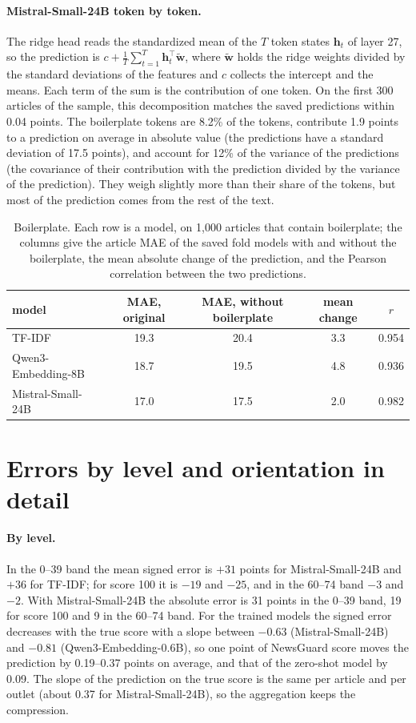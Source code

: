\documentclass[11pt,a4paper]{article}
\begin{document}
\paragraph{Mistral-Small-24B token by token.} The ridge head reads the standardized mean of the $T$ token states
$\mathbf{h}_t$ of layer 27, so the prediction is $c + \frac{1}{T}\sum_{t=1}^{T}\mathbf{h}_t^\top\tilde{\mathbf{w}}$,
where $\tilde{\mathbf{w}}$ holds the ridge weights divided by the standard deviations of the features and $c$ collects
the intercept and the means. Each term of the sum is the contribution of one token. On the first 300 articles of the
sample, this decomposition matches the saved predictions within 0.04 points. The boilerplate tokens are 8.2\% of the
tokens, contribute 1.9 points to a prediction on average in absolute value (the predictions have a standard deviation of
17.5 points), and account for 12\% of the variance of the predictions (the covariance of their contribution with the
prediction divided by the variance of the prediction). They weigh slightly more than their share of the tokens, but most
of the prediction comes from the rest of the text.

\begin{table}[h]
\centering
\caption{Boilerplate. Each row is a model, on 1,000 articles that contain boilerplate; the columns give the article MAE
of the saved fold models with and without the boilerplate, the mean absolute change of the prediction, and the Pearson
correlation between the two predictions.}\label{tab:reading}
\begin{tabular}{lcccc}
\toprule
model & MAE, original & MAE, without boilerplate & mean change & $r$ \\
\midrule
TF-IDF & 19.3 & 20.4 & 3.3 & 0.954 \\
Qwen3-Embedding-8B & 18.7 & 19.5 & 4.8 & 0.936 \\
Mistral-Small-24B & 17.0 & 17.5 & 2.0 & 0.982 \\
\bottomrule
\end{tabular}
\end{table}

\section{Errors by level and orientation in detail}\label{app:errors}
\paragraph{By level.} In the 0--39 band the mean signed error is $+31$ points for Mistral-Small-24B and $+36$ for TF-IDF;
for score 100 it is $-19$ and $-25$, and in the 60--74 band $-3$ and $-2$. With Mistral-Small-24B the absolute error is
31 points in the 0--39 band, 19 for score 100 and 9 in the 60--74 band. For the trained models the signed error
decreases with the true score with a slope between $-0.63$ (Mistral-Small-24B) and $-0.81$ (Qwen3-Embedding-0.6B), so
one point of NewsGuard score moves the prediction by 0.19--0.37 points on average, and that of the zero-shot model by
0.09. The slope of the prediction on the true score is the same per article and per outlet (about 0.37 for
Mistral-Small-24B), so the aggregation keeps the compression.
\end{document}
